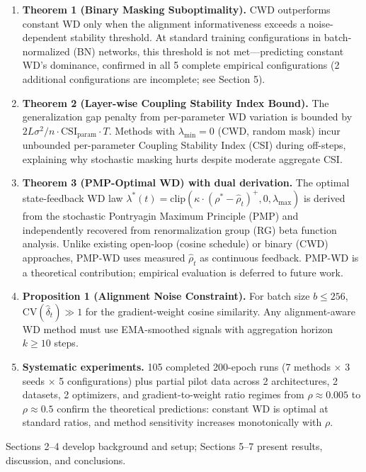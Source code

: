 \documentclass[
]{article}
\begin{document}
\begin{enumerate}
\def\labelenumi{\arabic{enumi}.}
\item
  \textbf{Theorem 1 (Binary Masking Suboptimality).} CWD outperforms
  constant WD only when the alignment informativeness exceeds a
  noise-dependent stability threshold. At standard training
  configurations in batch-normalized (BN) networks, this threshold is
  not met---predicting constant WD's dominance, confirmed in all 5
  complete empirical configurations (2 additional configurations are
  incomplete; see Section 5).
\item
  \textbf{Theorem 2 (Layer-wise Coupling Stability Index Bound).} The
  generalization gap penalty from per-parameter WD variation is bounded
  by \(2L\sigma^2/n \cdot \text{CSI}_\text{param} \cdot T\). Methods
  with \(\lambda_{\min} = 0\) (CWD, random mask) incur unbounded
  per-parameter Coupling Stability Index (CSI) during off-steps,
  explaining why stochastic masking hurts despite moderate aggregate
  CSI.
\item
  \textbf{Theorem 3 (PMP-Optimal WD) with dual derivation.} The optimal
  state-feedback WD law
  \(\lambda^*(t) = \text{clip}(\kappa \cdot (\rho^* - \hat{\rho}_t)^+, 0, \lambda_{\max})\)
  is derived from the stochastic Pontryagin Maximum Principle (PMP) and
  independently recovered from renormalization group (RG) beta function
  analysis. Unlike existing open-loop (cosine schedule) or binary (CWD)
  approaches, PMP-WD uses measured \(\hat{\rho}_t\) as continuous
  feedback. PMP-WD is a theoretical contribution; empirical evaluation
  is deferred to future work.
\item
  \textbf{Proposition 1 (Alignment Noise Constraint).} For batch size
  \(b \leq 256\), \(\text{CV}(\hat{\delta}_t) \gg 1\) for the
  gradient-weight cosine similarity. Any alignment-aware WD method must
  use EMA-smoothed signals with aggregation horizon \(k \geq 10\) steps.
\item
  \textbf{Systematic experiments.} 105 completed 200-epoch runs (7
  methods \(\times\) 3 seeds \(\times\) 5 configurations) plus partial
  pilot data across 2 architectures, 2 datasets, 2 optimizers, and
  gradient-to-weight ratio regimes from \(\rho \approx 0.005\) to
  \(\rho \approx 0.5\) confirm the theoretical predictions: constant WD
  is optimal at standard ratios, and method sensitivity increases
  monotonically with \(\rho\).
\end{enumerate}

Sections 2--4 develop background and setup; Sections 5--7 present
results, discussion, and conclusions.
\end{document}
